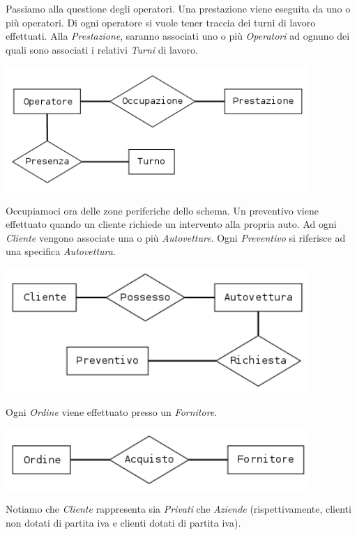 		Passiamo alla questione degli operatori. Una prestazione viene eseguita da uno o più operatori. Di ogni operatore si vuole tener traccia dei turni di lavoro effettuati.
		Alla \emph{Prestazione}, saranno associati uno o più \emph{Operatori} ad ognuno dei quali sono associati i relativi \emph{Turni} di lavoro.
		
		\includegraphics[width=11.5cm]{images/diagrams/operatore_turno_prestazione.png}
		
		Occupiamoci ora delle zone periferiche dello schema. Un preventivo viene effettuato quando un cliente richiede un intervento alla propria auto.
		Ad ogni \emph{Cliente} vengono associate una o più \emph{Autovetture}. Ogni \emph{Preventivo} si riferisce ad una specifica \emph{Autovettura}.
		
		\includegraphics[width=11.5cm]{images/diagrams/cliente_autovettura_preventivo.png}
		
		Ogni \emph{Ordine} viene effettuato presso un \emph{Fornitore}.
		
		\includegraphics[width=11.5cm]{images/diagrams/ordine_fornitore.png}
		
		Notiamo che \emph{Cliente} rappresenta sia \emph{Privati} che \emph{Aziende} (rispettivamente, clienti non dotati di partita iva e clienti dotati di partita iva).
		
